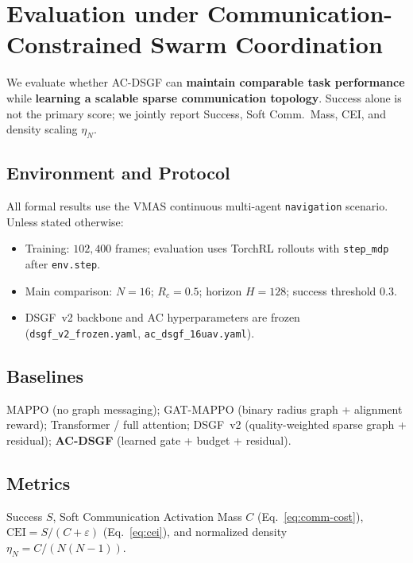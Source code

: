 
\section{Evaluation under Communication-Constrained Swarm Coordination}
\label{sec:setup}

We evaluate whether AC-DSGF can \textbf{maintain comparable task performance}
while \textbf{learning a scalable sparse communication topology}.
Success alone is not the primary score; we jointly report Success, Soft
Comm.\ Mass, CEI, and density scaling $\eta_N$.

\subsection{Environment and Protocol}
All formal results use the VMAS continuous multi-agent \texttt{navigation}
scenario.
Unless stated otherwise:
\begin{itemize}
  \item Training: $102{,}400$ frames; evaluation uses TorchRL rollouts with
        \texttt{step\_mdp} after \texttt{env.step}.
  \item Main comparison: $N{=}16$; $R_c{=}0.5$; horizon $H{=}128$;
        success threshold $0.3$.
  \item DSGF~v2 backbone and AC hyperparameters are frozen
        (\texttt{dsgf\_v2\_frozen.yaml}, \texttt{ac\_dsgf\_16uav.yaml}).
\end{itemize}

\subsection{Baselines}
MAPPO (no graph messaging);
GAT-MAPPO (binary radius graph + alignment reward);
Transformer / full attention;
DSGF~v2 (quality-weighted sparse graph + residual);
\textbf{AC-DSGF} (learned gate + budget + residual).

\subsection{Metrics}
Success $S$, Soft Communication Activation Mass $C$
(Eq.~\eqref{eq:comm-cost}),
$\mathrm{CEI}=S/(C+\varepsilon)$ (Eq.~\eqref{eq:cei}),
and normalized density $\eta_N=C/(N(N-1))$.

